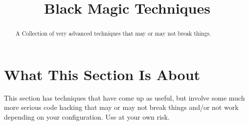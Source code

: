 \documentclass{ximera}
\title{Black Magic Techniques}
\begin{document}
\begin{abstract}
    A Collection of very advanced techniques that may or may not break things.
\end{abstract}
\maketitle
   
   
\section*{What This Section Is About}
    This section has techniques that have come up as useful, but involve some much more serious code hacking that may or may not break things and/or not work depending on your configuration. Use at your own risk.
        
\end{document}
